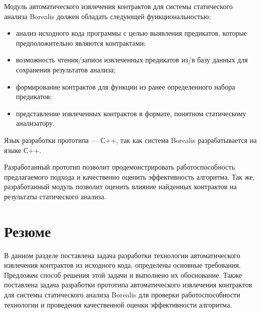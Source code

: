 Модуль автоматического извлечения контрактов для системы статического анализа Borealis должен обладать следующей функциональностью:
\begin{itemize}
\item анализ исходного кода программы с целью выявления предикатов, которые предположительно являются контрактами;
\item возможность чтения/записи извлеченных предикатов из/в базу данных для сохранения результатов анализа;
\item формирование контрактов для функции из ранее определенного набора предикатов;
\item представление извлеченных контрактов в формате, понятном статическому анализатору.
\end{itemize}
Язык разработки прототипа --- С++\cite{languageC++}, так как система Borealis разрабатывается на языке С++.

Разработанный прототип позволит продемонстрировать работоспособность предлагаемого подхода и качественно оценить эффективность алгоритма. Так же, разработанный модуль позволит оценить влияние найденных контрактов на результаты статического анализа.

\section{Резюме}
В данном разделе поставлена задача разработки технологии автоматического извлечения контрактов из исходного кода, определены основные требования. Предложен способ решения этой задачи и выполнено их обоснование. Также поставлена задача разработки прототипа автоматического извлечения контрактов для системы статического анализа Borealis для проверки работоспособности технологии и проведения качественной оценки эффективности алгоритма. 